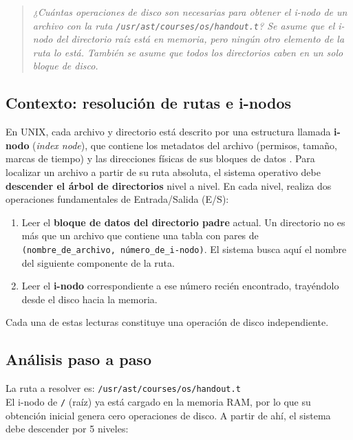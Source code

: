 \documentclass[12pt,letterpaper]{article}
\begin{document}
\begin{quote}
  \textit{¿Cuántas operaciones de disco son necesarias para obtener el i-nodo de un archivo con la ruta
    \texttt{/usr/ast/courses/os/handout.t}? Se asume que el i-nodo del directorio raíz está en memoria, pero
    ningún otro elemento de la ruta lo está. También se asume que todos los directorios caben en un solo bloque
    de disco.}
\end{quote}

\bigskip

\subsection*{Contexto: resolución de rutas e i-nodos}
\noindent
En UNIX, cada archivo y directorio está descrito por una estructura llamada \textbf{i-nodo}
(\textit{index node}), que contiene los metadatos del archivo (permisos, tamaño, marcas de tiempo) y las
direcciones físicas de sus bloques de datos \cite{tanenbaum2015}. Para localizar un archivo a partir de su ruta
absoluta, el sistema operativo debe \textbf{descender el árbol de directorios} nivel a nivel. En cada nivel,
realiza dos operaciones fundamentales de Entrada/Salida (E/S):

\begin{enumerate}[leftmargin=1.5cm, label=\textbf{\arabic*.}]
\item Leer el \textbf{bloque de datos del directorio padre} actual. Un directorio no es más que un archivo que
  contiene una tabla con pares de \texttt{(nombre\_de\_archivo, número\_de\_i-nodo)}. El sistema busca aquí el
  nombre del siguiente componente de la ruta.
  
\item Leer el \textbf{i-nodo} correspondiente a ese número recién encontrado, trayéndolo desde el disco hacia la
  memoria.
\end{enumerate}

\noindent
Cada una de estas lecturas constituye una operación de disco independiente.

\subsection*{Análisis paso a paso}
\noindent
La ruta a resolver es: \texttt{/usr/ast/courses/os/handout.t}\\

\noindent
El i-nodo de \texttt{/} (raíz) ya está cargado en la memoria RAM, por lo que su obtención inicial genera cero
operaciones de disco. A partir de ahí, el sistema debe descender por 5 niveles:
\end{document}
